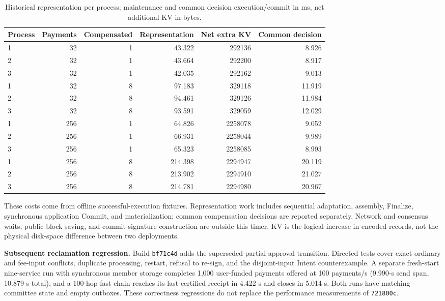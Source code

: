 \begin{table}[htbp]
\centering\small
\caption{Historical representation per process; maintenance and common decision execution/commit in ms, net additional KV in bytes.}
\label{tab:supp-final-reader}
\begin{tabular}{@{}lrrrrr@{}}
\toprule
Process & Payments & Compensated & Representation & Net extra KV & Common decision \\
\midrule
1 & 32 & 1 & 43.322 & 292136 & 8.926 \\
2 & 32 & 1 & 43.664 & 292200 & 8.917 \\
3 & 32 & 1 & 42.035 & 292162 & 9.013 \\
1 & 32 & 8 & 97.183 & 329118 & 11.919 \\
2 & 32 & 8 & 94.461 & 329126 & 11.984 \\
3 & 32 & 8 & 93.591 & 329059 & 12.029 \\
1 & 256 & 1 & 64.826 & 2258078 & 9.052 \\
2 & 256 & 1 & 66.931 & 2258044 & 9.989 \\
3 & 256 & 1 & 65.323 & 2258085 & 8.993 \\
1 & 256 & 8 & 214.398 & 2294947 & 20.119 \\
2 & 256 & 8 & 213.902 & 2294910 & 21.027 \\
3 & 256 & 8 & 214.781 & 2294980 & 20.967 \\
\bottomrule
\end{tabular}
\end{table}

These costs come from offline successful-execution fixtures. Representation work includes sequential adaptation, assembly, Finalize, synchronous application Commit, and materialization; common compensation decisions are reported separately. Network and consensus waits, public-block saving, and commit-signature construction are outside this timer. KV is the logical increase in encoded records, not the physical disk-space difference between two deployments.

\noindent\textbf{Subsequent reclamation regression.}
Build \texttt{bf71c4d} adds the superseded-partial-approval transition. Directed tests cover exact ordinary and fee-input conflicts, duplicate processing, restart, refusal to re-sign, and the disjoint-input Intent counterexample. A separate fresh-start nine-service run with synchronous member storage completes 1,000 user-funded payments offered at 100 payments/s (9.990-s send span, 10.879-s total), and a 100-hop fast chain reaches its last certified receipt in 4.422 s and closes in 5.014 s. Both runs have matching committee state and empty outboxes. These correctness regressions do not replace the performance measurements of \texttt{721800c}.
